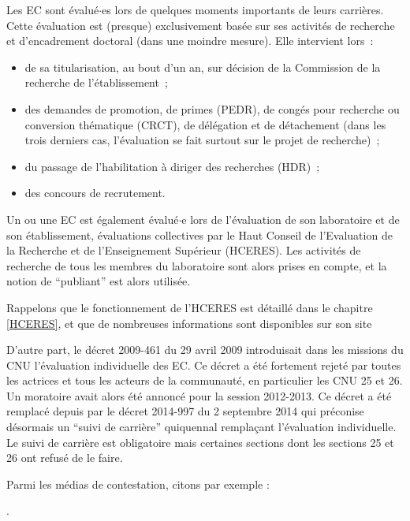 Les EC sont \'evalu\'e$\cdot$es lors de quelques moments importants de leurs carri\`eres.
Cette \'evaluation est (presque) exclusivement bas\'ee sur ses activit\'es de recherche
et d'encadrement doctoral (dans une moindre mesure).
Elle intervient lors~:
\begin{itemize}
\item de sa titularisation, au bout d'un an, sur d\'ecision de la Commission de la recherche de l'\'etablissement~;
\item des demandes de promotion, de primes (PEDR),
de cong\'es pour recherche ou conversion
th\'ematique (CRCT), de d\'el\'egation et de d\'etachement (dans les
trois derniers cas, l'\'evaluation se fait surtout sur le projet de
recherche)~;
\item du passage de l'habilitation \`a diriger des recherches (HDR)~;
\item des concours de recrutement.
\end{itemize}
Un ou une EC est \'egalement \'evalu\'e$\cdot$e lors de l'\'evaluation de son laboratoire
et de son \'etablissement,
\'evaluations collectives par le Haut Conseil de l'Evaluation de la
Recherche et de l'Enseignement Sup\'erieur (HCERES).
Les activit\'es de recherche de tous les membres du
laboratoire sont alors prises en compte, et la notion de ``publiant'' est
alors utilis\'ee.

Rappelons que le fonctionnement de l'HCERES est d\'etaill\'e dans le chapitre \ref{HCERES},
et que de nombreuses informations sont disponibles sur son site

D'autre part, le d\'ecret 2009-461 du 29 avril 2009 introduisait dans les missions du CNU l'\'evaluation individuelle des EC. 
Ce d\'ecret a \'et\'e fortement rejet\'e par toutes les actrices et tous les acteurs de la communaut\'e, en particulier les CNU 25 et 26.
Un moratoire avait alors \'et\'e annonc\'e pour la session 2012-2013. 
Ce d\'ecret a \'et\'e remplac\'e depuis par le d\'ecret 2014-997 du 2 septembre 2014 qui pr\'econise
d\'esormais un ``suivi de carri\`ere'' quiquennal rempla\c{c}ant l'\'evaluation individuelle. Le suivi de carrière est obligatoire mais certaines sections dont les sections 25 et 26 ont refusé de le faire.


Parmi les m\'edias de contestation, citons par exemple :

.

